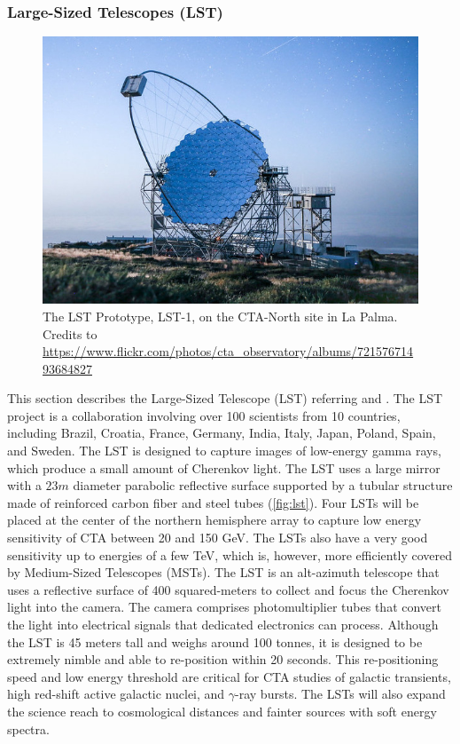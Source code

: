 \subsubsection{Large-Sized Telescopes (LST)}
\begin{figure}[t]
\centering
\includegraphics[width=0.9\linewidth]{figures/introduction/lst.jpg}
\caption{The LST Prototype, LST-1, on the CTA-North site in La Palma. Credits to \url{https://www.flickr.com/photos/cta_observatory/albums/72157671493684827}} 
\label{fig:lst}
\end{figure}
This section describes the Large-Sized Telescope (LST) referring \cite{Barrio_2020} and \cite{ctaobservatorywebsitetechnology}.
The LST project is a collaboration involving over 100 scientists from 10 countries, including Brazil, Croatia, France, Germany, India, Italy, Japan, Poland, Spain, and Sweden. The LST is designed to capture images of low-energy gamma rays, which produce a small amount of Cherenkov light. The LST uses a large mirror with a $23m$ diameter parabolic reflective surface supported by a tubular structure made of reinforced carbon fiber and steel tubes (\autoref{fig:lst}). Four LSTs will be placed at the center of the northern hemisphere array to capture low energy sensitivity of CTA between 20 and 150 GeV. The LSTs also have a very good sensitivity up to energies of a few TeV, which is, however, more efficiently covered by Medium-Sized Telescopes (MSTs). The LST is an alt-azimuth telescope that uses a reflective surface of 400 squared-meters to collect and focus the Cherenkov light into the camera. The camera comprises photomultiplier tubes that convert the light into electrical signals that dedicated electronics can process. Although the LST is 45 meters tall and weighs around 100 tonnes, it is designed to be extremely nimble and able to re-position within 20 seconds. This re-positioning speed and low energy threshold are critical for CTA studies of galactic transients, high red-shift active galactic nuclei, and $\gamma$-ray bursts. The LSTs will also expand the science reach to cosmological distances and fainter sources with soft energy spectra. 

